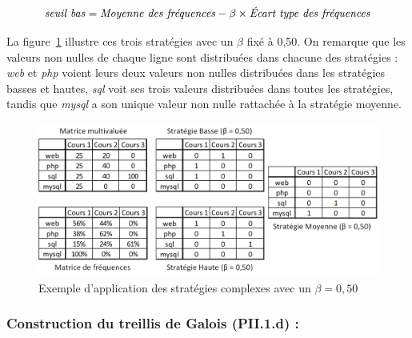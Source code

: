 \begin{equation}
\text{\textit{seuil bas}} = \text{\textit{Moyenne des fréquences}} - \beta \times \text{\textit{Écart type des fréquences}}
\label{equation:2-S2-Strategies-Seuil-Bas}
\end{equation}

\bigskip

La figure~\ref{figure:2-S2-Strategies-Exemple-Beta} illustre ces trois stratégies avec un $ \beta $ fixé à 0,50.
On remarque que les valeurs non nulles de chaque ligne sont distribuées dans chacune des stratégies : \textit{web} et \textit{php} voient leurs deux valeurs non nulles distribuées dans les stratégies basses et hautes, \textit{sql} voit ses trois valeurs distribuées dans toutes les stratégies, tandis que \textit{mysql} a son unique valeur non nulle rattachée à la stratégie moyenne.

\begin{figure}[ht]
\centering
\centerline{  %
\includegraphics[scale=1]{2-Etat-de-l'Art/images/ACF/Strategies/exemple_strategies_beta=0.50.png}
}
\caption{Exemple d'application des stratégies complexes avec un $ \beta = 0,50 $}
\label{figure:2-S2-Strategies-Exemple-Beta}
\end{figure}



\bigskip


\subsubsection{Construction du treillis de Galois (PII.1.d) :}
\label{subsubsection:Contexte:ACF-ConstructionTreillis}

